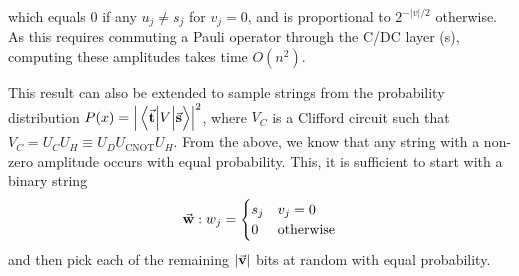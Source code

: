 which equals $0$ if any $u_{j}\neq s_{j}$ for $v_{j}=0$, and is proportional to $2^{-\left\vert v\right\vert/2}$ otherwise. As this requires commuting a Pauli operator through the C/DC layer (s), computing these amplitudes takes time $O(n^{2})$.\par
This result can also be extended to sample strings from the probability distribution $P(x)=\left\vert\matrixel{\va{t}}{V}{\va{s}}\right\vert^{2}$, where $V_{C}$ is a Clifford circuit such that $V_{C}=U_{C}U_{H}\equiv U_{D}U_{\text{CNOT}}U_{H}$. From the above, we know that any string with a non-zero amplitude occurs with equal probability. This, it is sufficient to start with a binary string
\[\va{w}:w_{j}=\begin{cases}s_{j} & v_{j}=0 \\ 0 & \text{otherwise}\end{cases}\]
and then pick each of the remaining $\left\vert \va{v}\right\vert$ bits at random with equal probability.
